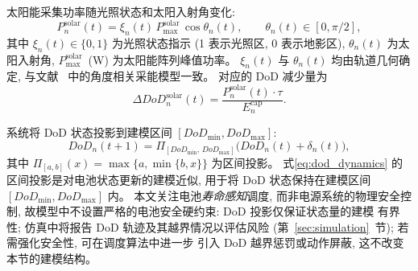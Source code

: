 \documentclass[a4paper,11pt]{article}
\begin{document}
太阳能采集功率随光照状态和太阳入射角变化:
\begin{equation}
    P^{\mathrm{solar}}_n(t) = \xi_n(t)\, P^{\mathrm{solar}}_{\max}\,
    \cos\theta_n(t),
    \qquad \theta_n(t) \in [0, \pi/2],
    \label{eq:solar_power}
\end{equation}
其中 $\xi_n(t) \in \{0, 1\}$ 为光照状态指示 (1 表示光照区,
0 表示地影区), $\theta_n(t)$ 为太阳入射角, 
$P^{\mathrm{solar}}_{\max}$~(W) 为太阳能阵列峰值功率。
$\xi_n(t)$ 与 $\theta_n(t)$ 均由轨道几何确定, 
与文献~\cite{li2024battery} 中的角度相关采能模型一致。
对应的 DoD 减少量为
\begin{equation}
    \Delta DoD^{\mathrm{solar}}_n(t)
    = \frac{P^{\mathrm{solar}}_n(t) \cdot \tau}{E^{\mathrm{cap}}_n}.
    \label{eq:dod_solar}
\end{equation}



系统将 DoD 状态投影到建模区间 $[DoD_{\min}, DoD_{\max}]$:
\begin{equation}
    DoD_n(t+1) = 
    \Pi_{[DoD_{\min},\, DoD_{\max}]}\!\big(
    DoD_n(t) + \delta_n(t)\big),
    \label{eq:dod_dynamics}
\end{equation}
其中 $\Pi_{[a,b]}(x) = \max\{a, \min\{b, x\}\}$ 为区间投影。
式\eqref{eq:dod_dynamics} 的区间投影是对电池状态更新的建模近似,
用于将 DoD 状态保持在建模区间 $[DoD_{\min}, DoD_{\max}]$ 内。
本文关注电池\emph{寿命感知}调度, 而非电源系统的物理安全控制,
故模型中不设置严格的电池安全硬约束: DoD 投影仅保证状态量的建模
有界性; 仿真中将报告 DoD 轨迹及其越界情况以评估风险
(第~\ref{sec:simulation}~节); 若需强化安全性, 可在调度算法中进一步
引入 DoD 越界惩罚或动作屏蔽, 这不改变本节的建模结构。
\end{document}

